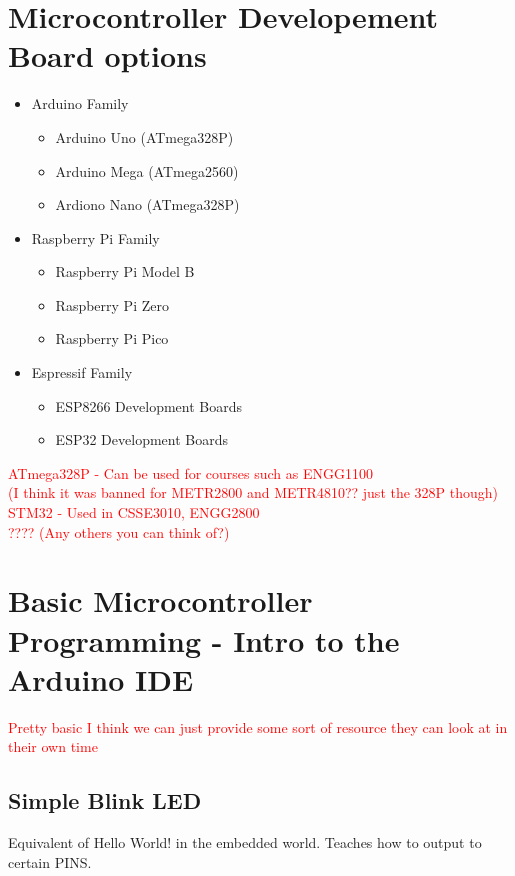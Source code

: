 \documentclass[a4paper,12pt]{report}
\begin{document}
\pagebreak

\section*{Microcontroller Developement Board options}
\begin{itemize}
    \item Arduino Family
    \begin{itemize}
        \item Arduino Uno (ATmega328P)
        \item Arduino Mega (ATmega2560)
        \item Ardiono Nano (ATmega328P)
    \end{itemize}
    \item Raspberry Pi Family 
    \begin{itemize}
        \item Raspberry Pi Model B
        \item Raspberry Pi Zero
        \item Raspberry Pi Pico
    \end{itemize}
    \item Espressif Family
    \begin{itemize}
        \item ESP8266 Development Boards
        \item ESP32 Development Boards
    \end{itemize}
\end{itemize}

\textcolor{red}{ATmega328P - Can be used for courses such as ENGG1100\\ (I think it was banned for METR2800 and METR4810?? just the 328P though)
STM32 - Used in CSSE3010, ENGG2800\\
???? (Any others you can think of?)}



\section*{Basic Microcontroller Programming - Intro to the Arduino IDE}

\textcolor{red}{Pretty basic I think we can just provide some
sort of resource they can look at in their own time}

\subsection*{Simple Blink LED}
Equivalent of Hello World! in the embedded world. Teaches how to output to certain PINS.
\end{document}
